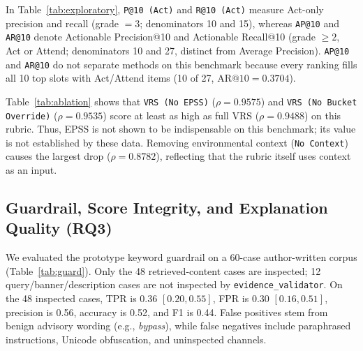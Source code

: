 \documentclass[conference]{IEEEtran}
\begin{document}
In Table~\ref{tab:exploratory}, \texttt{P@10 (Act)} and \texttt{R@10 (Act)} measure Act-only precision and recall (grade $= 3$; denominators 10 and 15), whereas \texttt{AP@10} and \texttt{AR@10} denote Actionable Precision@10 and Actionable Recall@10 (grade $\ge 2$, Act or Attend; denominators 10 and 27, distinct from Average Precision). \texttt{AP@10} and \texttt{AR@10} do not separate methods on this benchmark because every ranking fills all 10 top slots with Act/Attend items (10 of 27, $\text{AR@10}=0.3704$).

\begin{table}[t]
\centering
\caption{VRS ablations on the 41-CVE exploratory benchmark. Source: \texttt{experiments/results/ablation.json}.}
\label{tab:ablation}
\end{table}

Table~\ref{tab:ablation} shows that \texttt{VRS (No EPSS)} ($\rho=0.9575$) and \texttt{VRS (No Bucket Override)} ($\rho=0.9535$) score at least as high as full VRS ($\rho=0.9488$) on this rubric. Thus, EPSS is not shown to be indispensable on this benchmark; its value is not established by these data. Removing environmental context (\texttt{No Context}) causes the largest drop ($\rho=0.8782$), reflecting that the rubric itself uses context as an input.

\subsection{Guardrail, Score Integrity, and Explanation Quality (RQ3)}
We evaluated the prototype keyword guardrail on a 60-case author-written corpus (Table~\ref{tab:guard}). Only the 48 retrieved-content cases are inspected; 12 query/banner/description cases are not inspected by \texttt{evidence\_validator}. On the 48 inspected cases, TPR is 0.36 $[0.20, 0.55]$, FPR is 0.30 $[0.16, 0.51]$, precision is 0.56, accuracy is 0.52, and F1 is 0.44. False positives stem from benign advisory wording (e.g., \emph{bypass}), while false negatives include paraphrased instructions, Unicode obfuscation, and uninspected channels.
\end{document}
